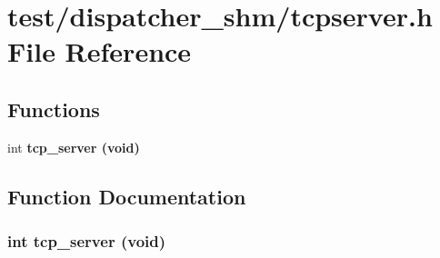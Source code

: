 \section{test/dispatcher\_\-shm/tcpserver.h File Reference}
\label{dispatcher__shm_2tcpserver_8h}
\subsection*{Functions}
\begin{CompactItemize}
\item 
int \bf{tcp\_\-server} (void)
\end{CompactItemize}


\subsection{Function Documentation}
\subsubsection{\setlength{\rightskip}{0pt plus 5cm}int tcp\_\-server (void)}\label{dispatcher__shm_2tcpserver_8h_670df12c784cbf1b260ab50397194b66}


